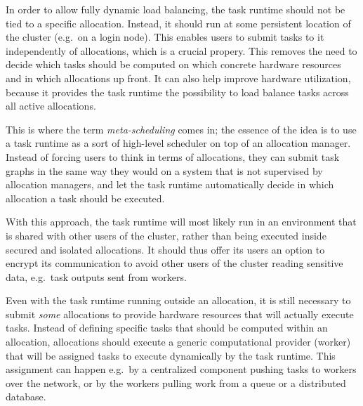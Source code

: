 \begin{description}[wide=0pt]
	\item[Task runtime runs outside of allocations] In order to allow fully dynamic load balancing, the task runtime should not be tied to a specific
		allocation. Instead, it should run at some persistent location of the cluster (e.g.\ on a login
		node). This enables users to submit tasks to it independently of allocations, which is a crucial
		propery. This removes the need to decide which tasks should be computed on which concrete hardware
		resources and in which allocations up front. It can also help improve hardware utilization, because
		it provides the task runtime the possibility to load balance tasks across all active allocations.

		This is where the term \emph{meta-scheduling} comes in; the essence of the idea is to use a task
		runtime as a sort of high-level scheduler on top of an allocation manager. Instead of forcing users
		to think in terms of allocations, they can submit task graphs in the same way they would on a
		system that is not supervised by allocation managers, and let the task runtime automatically decide
		in which allocation a task should be executed.

		With this approach, the task runtime will most likely run in an environment that is shared with
		other users of the cluster, rather than being executed inside secured and isolated allocations. It
		should thus offer its users an option to encrypt its communication to avoid other users of the
		cluster reading sensitive data, e.g.\ task outputs sent from workers.
	\item[Allocations are uniform] Even with the task runtime running outside an allocation, it is still necessary to submit
		\emph{some} allocations to provide hardware resources that will actually execute tasks.
		Instead of defining specific tasks that should be computed within an allocation, allocations should
		execute a generic computational provider (worker) that will be assigned tasks to execute
		dynamically by the task runtime. This assignment can happen e.g.\ by a centralized component
		pushing tasks to workers over the network, or by the workers pulling work from a queue or a
		distributed database.


\end{description}
